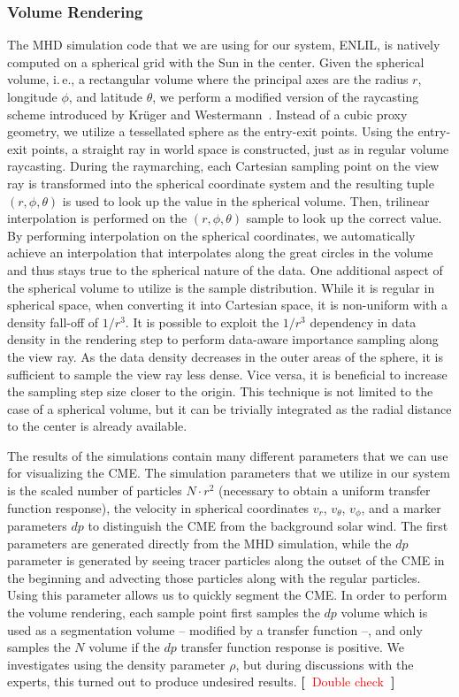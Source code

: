 \documentclass[journal]{vgtc}                %
\newcommand{\todo}[1] {\textbf{[~}\textcolor {red}{#1}\marginpar{\textcolor {red}{\centerline{{\Huge \textbf{!}}}}}\textbf{~]}}
\newcommand{\todo}[1] {\textbf{[~}\textcolor {red}{#1}\marginpar{\textcolor {red}{\centerline{{\Huge \textbf{!}}}}}\textbf{~]}}
\begin{document}
\subsubsection{Volume Rendering} \label{sec:volumerendering}
The MHD simulation code that we are using for our system, ENLIL, is natively computed on a spherical grid with the Sun in the center. Given the spherical volume, i.\,e., a rectangular volume where the principal axes are the radius $r$, longitude $\phi$, and latitude $\theta$, we perform a modified version of the raycasting scheme introduced by Kr\"uger and Westermann~\cite{Kruger:2003ge}. Instead of a cubic proxy geometry, we utilize a tessellated sphere as the entry-exit points. Using the entry-exit points, a straight ray in world space is constructed, just as in regular volume raycasting. During the raymarching, each Cartesian sampling point on the view ray is transformed into the spherical coordinate system and the resulting tuple $(r, \phi, \theta)$ is used to look up the value in the spherical volume. Then, trilinear interpolation is performed on the $(r, \phi, \theta)$ sample to look up the correct value. By performing interpolation on the spherical coordinates, we automatically achieve an interpolation that interpolates along the great circles in the volume and thus stays true to the spherical nature of the data. One additional aspect of the spherical volume to utilize is the sample distribution. While it is regular in spherical space, when converting it into Cartesian space, it is non-uniform with a density fall-off of $1/r^3$. It is possible to exploit the $1/r^3$ dependency in data density in the rendering step to perform data-aware importance sampling along the view ray. As the data density decreases in the outer areas of the sphere, it is sufficient to sample the view ray less dense. Vice versa, it is beneficial to increase the sampling step size closer to the origin. This technique is not limited to the case of a spherical volume, but it can be trivially integrated as the radial distance to the center is already available.

 The results of the simulations contain many different parameters that we can use for visualizing the CME. The simulation parameters that we utilize in our system is the scaled number of particles $N \cdot r^2$ (necessary to obtain a uniform transfer function response), the velocity in spherical coordinates $v_r$, $v_\theta$, $v_\phi$, and a marker parameters $dp$ to distinguish the CME from the background solar wind. The first parameters are generated directly from the MHD simulation, while the $dp$ parameter is generated by seeing tracer particles along the outset of the CME in the beginning and advecting those particles along with the regular particles. Using this parameter allows us to quickly segment the CME. In order to perform the volume rendering, each sample point first samples the $dp$ volume which is used as a segmentation volume  -- modified by a transfer function --, and only samples the $N$ volume if the $dp$ transfer function response is positive. We investigates using the density parameter $\rho$, but during discussions with the experts, this turned out to produce undesired results. \todo{Double check}
\end{document}
